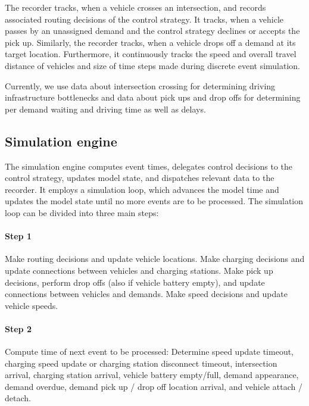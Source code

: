 \documentclass[a4paper,twoside]{article}
\begin{document}
	The recorder tracks, when a vehicle crosses an intersection, and records associated routing decisions of the control strategy.
	It tracks, when a vehicle passes by an unassigned demand and the control strategy declines or accepts the pick up.
	Similarly, the recorder tracks, when a vehicle drops off a demand at its target location.
	Furthermore, it continuously tracks the speed and overall travel distance of vehicles and size of time steps made during discrete event simulation.
	
	Currently, we use data about intersection crossing for determining driving infrastructure bottlenecks and data about pick ups and drop offs for determining per demand waiting and driving time as well as delays.
	
	\subsection{Simulation engine}
	\label{sec:simulation-engine}
	
	The simulation engine computes event times, delegates control decisions to the control strategy, updates model state, and dispatches relevant data to the recorder.
	It employs a simulation loop, which advances the model time and updates the model state until no more events are to be processed.
	The simulation loop can be divided into three main steps:
	
	\paragraph{Step 1}
	
	Make routing decisions and update vehicle locations.
	Make charging decisions and update connections between vehicles and charging stations.
	Make pick up decisions, perform drop offs (also if vehicle battery empty), and update connections between vehicles and demands.
	Make speed decisions and update vehicle speeds.
	
	\paragraph{Step 2}
	
	Compute time of next event to be processed:
	Determine speed update timeout,
	charging speed update or charging station disconnect timeout,
	intersection arrival,
	charging station arrival,
	vehicle battery empty/full,
	demand appearance,
	demand overdue,
	demand pick up / drop off location arrival, and
	vehicle attach / detach.
	
\end{document}
